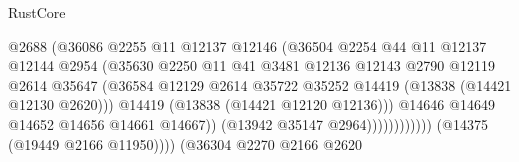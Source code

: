 \begin{lexlean}{RustCore}
\begin{coremodule}
                                                @2688
                                                (@36086
                                                  @2255
                                                  @11
                                                  @12137
                                                  @12146
                                                  (@36504
                                                    @2254
                                                    @44
                                                    @11
                                                    @12137
                                                    @12144
                                                    @2954
                                                    (@35630
                                                      @2250
                                                      @11
                                                      @41
                                                      @3481
                                                      @12136
                                                      @12143
                                                      @2790
                                                      @12119
                                                      @2614
                                                      @35647
                                                      (@36584
                                                        @12129
                                                        @2614
                                                        @35722
                                                        @35252
                                                        @14419
                                                        (@13838 (@14421 @12130 @2620)))
                                                      @14419
                                                      (@13838 (@14421 @12120 @12136)))
                                                    @14646
                                                    @14649
                                                    @14652
                                                    @14656
                                                    @14661
                                                    @14667))
                                                (@13942 @35147 @2964))))))))))))
                          (@14375 (@19449 @2166 @11950))))
                      (@36304
                        @2270
                        @2166
                        @2620

\end{coremodule}
\end{lexlean}
